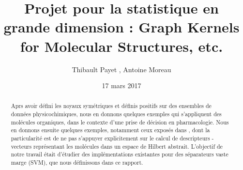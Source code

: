 \documentclass[a4paper,11pt]{article}
\title{Projet pour la statistique en grande dimension : Graph Kernels for Molecular Structures, etc.}
\author{Thibault Payet , Antoine Moreau}
\date{17 mars 2017}
\begin{document}
    
    \maketitle

    \begin{abstract}
    Aprs avoir d\'efini les noyaux sym\'etriques et d\'efinis positifs sur des ensembles de donn\'ees physicochimiques, %
    nous en donnons quelques exemples qui s'appliquent  des mol\'ecules organiques, dans le contexte d'une prise de d\'ecision en pharmacologie. %
    Nous en donnons ensuite quelques exemples, notamment ceux expos\'es dans \cite{Mahe}, dont la particularit\'e est de ne pas s'appuyer explicitement sur le calcul de descripteurs %
    -vecteurs repr\'esentant les mol\'ecules dans un espace de Hilbert abstrait. %
    L'objectif de notre travail \'etait d'\'etudier des impl\'ementations existantes pour des s\'eparateurs  vaste marge (SVM), que nous d\'efinissons dans ce rapport.
    \end{abstract}


    
    



    
\end{document}
